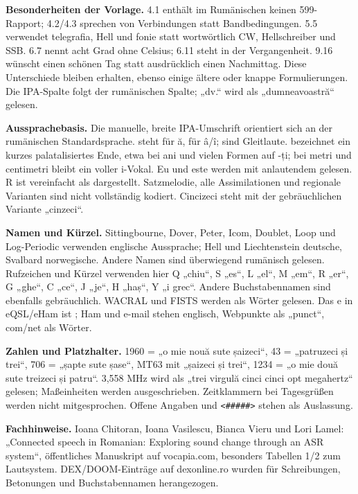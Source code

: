 \documentclass[a4paper,landscape,10pt]{article}
\newcommand{\ipa}[1]{{\ipafont[#1]}}
\begin{document}
\smallskip
\textbf{Besonderheiten der Vorlage.} 4.1 enthält im Rumänischen keinen 599-Rapport;
4.2/4.3 sprechen von Verbindungen statt Bandbedingungen. 5.5 verwendet telegrafia, Hell und fonie
statt wortwörtlich CW, Hellschreiber und SSB. 6.7 nennt acht Grad ohne Celsius;
6.11 steht in der Vergangenheit. 9.16 wünscht einen schönen Tag statt ausdrücklich einen Nachmittag.
Diese Unterschiede bleiben erhalten, ebenso einige ältere oder knappe Formulierungen.
Die IPA-Spalte folgt der rumänischen Spalte; „dv.“ wird als „dumneavoastră“ gelesen.

\smallskip
\textbf{Aussprachebasis.} Die manuelle, breite IPA-Umschrift orientiert sich an der rumänischen
Standardsprache. \ipa{ə} steht für ă, \ipa{ɨ} für â/î; \ipa{j, w} sind Gleitlaute.
\ipa{ʲ} bezeichnet ein kurzes palatalisiertes Ende, etwa bei ani und vielen Formen auf -ți;
bei metri und centimetri bleibt ein voller i-Vokal. Eu und este werden mit anlautendem \ipa{j} gelesen.
R ist vereinfacht als \ipa{r} dargestellt. Satzmelodie, alle Assimilationen und regionale Varianten
sind nicht vollständig kodiert. Cincizeci steht mit der gebräuchlichen Variante „cinzeci“.

\smallskip
\textbf{Namen und Kürzel.} Sittingbourne, Dover, Peter, Icom, Doublet, Loop und Log-Periodic
verwenden englische Aussprache; Hell und Liechtenstein deutsche, Svalbard norwegische.
Andere Namen sind überwiegend rumänisch gelesen. Rufzeichen und Kürzel verwenden hier Q „chiu“,
S „es“, L „el“, M „em“, R „er“, G „ghe“, C „ce“, J „je“, H „haș“, Y „i grec“.
Andere Buchstabennamen sind ebenfalls gebräuchlich. WACRAL und FISTS werden als Wörter gelesen.
Das e in eQSL/eHam ist \ipa{i}; Ham und e-mail stehen englisch, Webpunkte als „punct“, com/net als Wörter.

\smallskip
\textbf{Zahlen und Platzhalter.} 1960 = „o mie nouă sute șaizeci“, 43 = „patruzeci și trei“,
706 = „șapte sute șase“, MT63 mit „șaizeci și trei“, 1234 = „o mie două sute treizeci și patru“.
3,558 MHz wird als „trei virgulă cinci cinci opt megahertz“ gelesen; Maßeinheiten werden ausgeschrieben.
Zeitklammern bei Tagesgrüßen werden nicht mitgesprochen. Offene Angaben und \texttt{<\#\#\#\#\#>}
stehen als Auslassung.

\smallskip
\textbf{Fachhinweise.} Ioana Chitoran, Ioana Vasilescu, Bianca Vieru und Lori Lamel:
„Connected speech in Romanian: Exploring sound change through an ASR system“,
öffentliches Manuskript auf vocapia.com, besonders Tabellen 1/2 zum Lautsystem.
DEX/DOOM-Einträge auf dexonline.ro wurden für Schreibungen, Betonungen und Buchstabennamen herangezogen.
\end{document}
